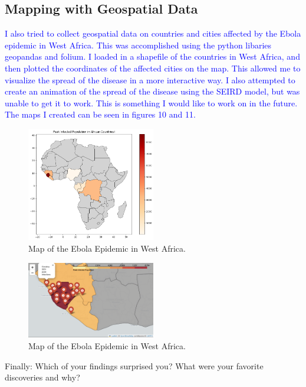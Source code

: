 \documentclass[%
 reprint,
superscriptaddress,
 amsmath,amssymb,
 aps,
floatfix,
]{revtex4-2}
\begin{document}
\subsection{Mapping with Geospatial Data}
\textcolor{blue}{
    I also tried to collect geospatial data on countries and cities affected by the Ebola epidemic in West Africa.
    This was accomplished using the python libaries geopandas and folium.
    I loaded in a shapefile of the countries in West Africa, and then plotted the coordinates of the affected cities on the map.
    This allowed me to visualize the spread of the disease in a more interactive way.
    I also attempted to create an animation of the spread of the disease using the SEIRD model, but was unable to get it to work.
    This is something I would like to work on in the future.
    The maps I created can be seen in figures 10 and 11.}
\begin{figure}
    \centering
    \includegraphics[width=0.5\textwidth]{PeakInfectedAfrica.png}
    \caption{Map of the Ebola Epidemic in West Africa.}
    \label{Ebola Map}
\end{figure}
\begin{figure}
    \centering
    \includegraphics[width=0.5\textwidth]{InteractiveMap.png}
    \caption{Map of the Ebola Epidemic in West Africa.}
    \label{Ebola Map}
\end{figure}

Finally: Which of your findings surprised you? What were your favorite discoveries and why? 
\end{document}

